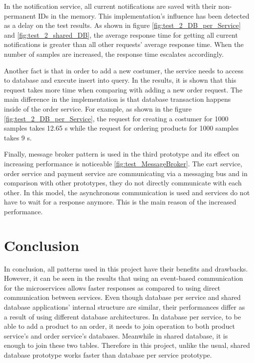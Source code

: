 \documentclass{article}
\begin{document}
\noindent In the notification service, all current notifications are saved with their non- permanent IDs in the memory. This implementation’s influence has been detected as a delay on the test results. As shown in figure \ref{fig:test_2_DB_per_Service} and \ref{fig:test_2_shared_DB}, the average response time for getting all current notifications is greater than all other requests’ average response time. When the number of samples are increased, the response time escalates accordingly.

\bigbreak
\noindent Another fact is that in order to add a new costumer, the service needs to access to database and execute insert into query. In the results, it is shown that this request takes more time when comparing with adding a new order request. The main difference in the implementation is that database transaction happens inside of the order service. For example, as shown in the figure \ref{fig:test_2_DB_per_Service}, the request for creating a costumer for 1000 samples takes 12.65 s while the request for ordering products for 1000 samples takes 9 s.

\bigbreak
\noindent Finally, message broker pattern is used in the third prototype and its effect on increasing performance is noticeable \ref{fig:test_MessageBroker}. The cart service, order service and payment service are communicating via a messaging bus and in comparison with other prototypes,  they do not directly communicate with each other. In this model, the asynchronous communication is used and services do not have to wait for a response anymore. This is the main reason of the increased performance.  

\pagebreak

\section{Conclusion}
In conclusion, all patterns used in this project have their benefits and drawbacks. However, it can be seen in the results that using an event-based communication for the microservices allows faster responses as compared to using direct communication between services. Even though database per service and shared database applications' internal structure are similar, their performances differ as a result of using different database architectures. In database per service, to be able to add a product to an order, it needs to join operation to both product service's and order service's databases. Meanwhile in shared database, it is enough to join these two tables. Therefore in this project, unlike the usual, shared database prototype works faster than database per service prototype. 
\end{document}
